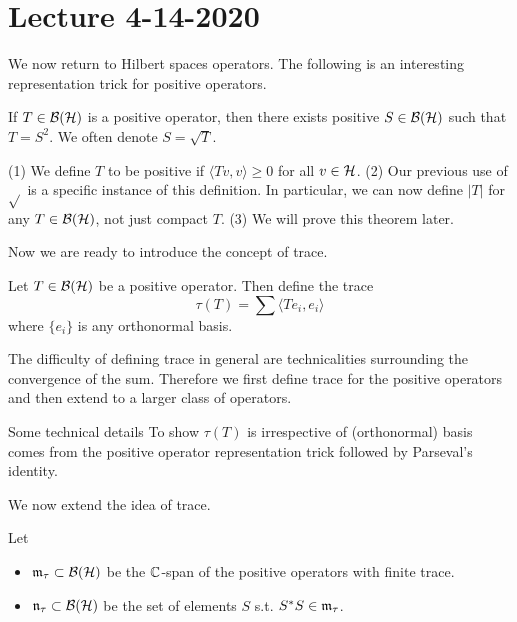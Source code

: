 \section{Lecture 4-14-2020}
We now return to Hilbert spaces operators. The following is an interesting representation trick for positive operators.
\begin{thm}
    \label{positive operator representation}
    If $T \in {\mathcal B}({\mathcal H})$ is a positive operator, then there exists positive $S \in {\mathcal B}({\mathcal H})$ such that $T = S^2$. We often denote $S = \sqrt{T}$.
\end{thm}
\begin{remark}
    (1) We define $T$ to be positive if $ \langle Tv, v \rangle \geq 0$ for all $v \in {\mathcal H}$. (2) Our previous use of $\sqrt{ }$ is a specific instance of this definition. In particular, we can now define $|T|$ for any $T \in {\mathcal B}({\mathcal H})$, not just compact $T$. (3) We will prove this theorem later.
\end{remark}
Now we are ready to introduce the concept of trace.
\begin{dfn}[Trace]
    Let $T \in {\mathcal B}({\mathcal H})$ be a positive operator. Then define the trace
    \[
        \tau(T) = \sum \langle Te_i, e_i\rangle
    \]
    where $\{e_i\}$ is any orthonormal basis.
\end{dfn}
\begin{remark}
    The difficulty of defining trace in general are technicalities surrounding the convergence of the sum. Therefore we first define trace for the positive operators and then extend to a larger class of operators.
\end{remark}
\begin{details}{Some technical details}
To show $\tau(T)$ is irrespective of (orthonormal) basis comes from the positive operator representation trick followed by Parseval's identity.
\end{details}

We now extend the idea of trace.

\begin{dfn}
    Let
    \begin{itemize}
        \item $\mathfrak{m}_\tau \subset {\mathcal B}({\mathcal H})$ be the ${\mathbb C}$-span of the positive operators with finite trace.
        \item $\mathfrak{n}_\tau \subset {\mathcal B}({\mathcal H})$ be the set of elements $S$ s.t. $S^*S \in \mathfrak{m}_\tau$.
    \end{itemize}
\end{dfn}

